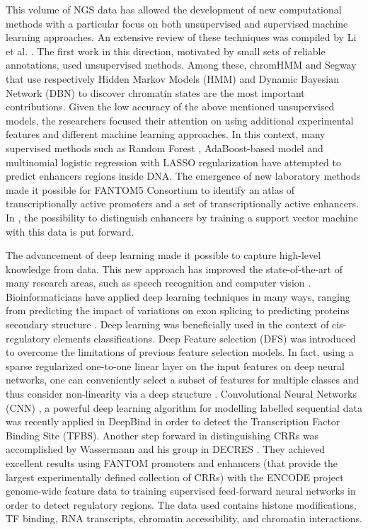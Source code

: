 This volume of NGS data has allowed the development of new computational
methods with a particular focus on both unsupervised and supervised machine
learning approaches. An extensive review of these techniques was compiled by Li et al. \cite{LiMLReview}. The first work in this direction, motivated by small sets of reliable annotations, used unsupervised methods. Among these, chromHMM \cite{ernst2012chromhmm}
and Segway \cite{HoffmanSegway} that use respectively Hidden Markov Models
(HMM) and Dynamic Bayesian Network (DBN) to discover chromatin states are the most important contributions. Given the low accuracy of the above mentioned unsupervised models, the researchers focused their attention on using additional experimental features and
different machine learning approaches. In this context, many supervised
methods such as Random Forest \cite{RFECS}, AdaBoost-based model
\cite{DELTA_adaboost} and multinomial logistic regression with LASSO
regularization \cite{ChenMultinomialLASSORegression} have attempted to predict enhancers regions inside DNA. The emergence of new
laboratory methods made it possible for FANTOM5 Consortium to identify an
atlas of transcriptionally active promoters and a set of transcriptionally
active enhancers. In \cite{DEEP}, the possibility to distinguish enhancers by
training a support vector machine with this data is put forward.

The advancement of deep learning made it possible to capture
high-level knowledge from data. This new approach has improved
the state-of-the-art of many research areas, such as speech recognition and
computer
vision \cite{lecun2015deeplearning}. Bioinformaticians have
applied deep learning techniques in many ways, ranging from predicting the impact
of variations on exon splicing \cite{XiongExon} to predicting proteins
secondary structure \cite{SecondaryStructure}. Deep learning was beneficially used in the context of cis-regulatory elements classifications. 
Deep Feature selection (DFS) was introduced to
overcome the limitations of previous feature selection models. In fact,
using a sparse regularized one-to-one linear layer on the input features
on deep neural networks, one can conveniently select a subset of features
for multiple classes and thus consider non-linearity via a deep
structure \cite{LiYifengDFS}. Convolutional Neural Networks (CNN) \cite{LecunCNN,
MartinezCNN}, a powerful deep learning algorithm for modelling
labelled sequential data was recently applied in DeepBind
\cite{AlipanahiDeepBind} in order to detect the Transcription Factor
Binding Site (TFBS).
Another step forward in distinguishing CRRs was accomplished by Wassermann
and his group in DECRES \cite{WassermannDECRES}. They achieved
excellent results using FANTOM promoters and enhancers (that provide the
largest experimentally defined collection of CRRs) with the ENCODE project
genome-wide feature data to
training supervised feed-forward neural networks in order to detect
regulatory regions. The data used contains histone modifications, TF binding, RNA transcripts, chromatin accessibility, and chromatin interactions.

